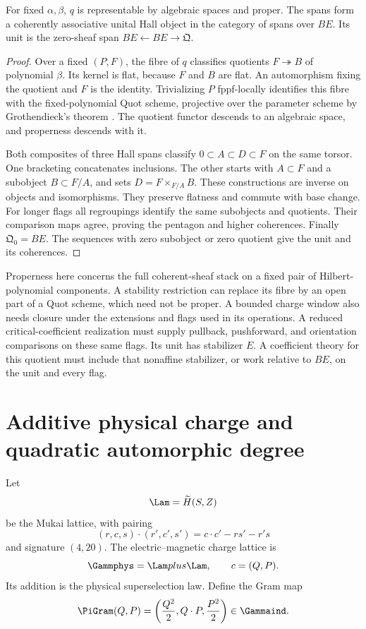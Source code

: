 \begin{theorem}
\label{igusa:platonic-common-torsor-hall}
For fixed \(\alpha,\beta\), \(q\) is representable by
algebraic spaces and proper. The spans form a coherently associative
unital Hall object in the category of spans over \(BE\).
Its unit is the zero-sheaf span
\(BE\leftarrow BE\to\mathfrak Q\).
\end{theorem}
\begin{proof}
Over a fixed \((P,F)\), the fibre of \(q\) classifies
quotients \(F\twoheadrightarrow B\) of polynomial \(\beta\).
Its kernel is flat, because \(F\) and \(B\) are flat.
An automorphism fixing the quotient and \(F\) is the identity.
Trivializing \(P\) fppf-locally identifies this fibre with the
fixed-polynomial Quot scheme, projective over the parameter scheme
by Grothendieck's theorem \cite[Theorem~3.2]{IgusaGrothendieckQuot1961}.
The quotient functor descends to an algebraic space, and properness
descends with it.

Both composites of three Hall spans classify
\(0\subset A\subset D\subset F\) on the same torsor.
One bracketing concatenates inclusions. The other starts with
\(A\subset F\) and a subobject \(B\subset F/A\), and sets
\(D=F\times_{F/A}B\). These constructions are inverse on
objects and isomorphisms. They preserve flatness and commute with
base change. For longer flags all regroupings identify the same
subobjects and quotients. Their comparison maps agree, proving the
pentagon and higher coherences. Finally \(\mathfrak Q_0=BE\).
The sequences with zero subobject or zero quotient give the unit
and its coherences.
\end{proof}

Properness here concerns the full coherent-sheaf stack on a fixed
pair of Hilbert-polynomial components. A stability restriction can
replace its fibre by an open part of a Quot scheme, which need not
be proper. A bounded charge window also needs closure under the
extensions and flags used in its operations. A reduced critical-coefficient realization must supply pullback,
pushforward, and orientation comparisons on these same flags. Its unit has
stabilizer \(E\). A coefficient theory for this quotient must
include that nonaffine stabilizer, or work relative to \(BE\),
on the unit and every flag.


\section{Additive physical charge and quadratic automorphic degree}
Let
\[
 \Lam=\widetilde H(S,\Z)
\]
be the Mukai lattice, with pairing
\[
 (r,c,s)\cdot(r',c',s')=c\cdot c'-rs'-r's
\]
and signature $(4,20)$. The electric--magnetic charge lattice is
\[
 \Gammphys=\Lam\oplus\Lam,
 \qquad c=(Q,P).
\]
Its addition is the physical superselection law. Define the Gram map
\[
 \PiGram(Q,P)=
 \left(\frac{Q^2}{2},Q\cdot P,\frac{P^2}{2}\right)
 \in\Gammaind.
\]

